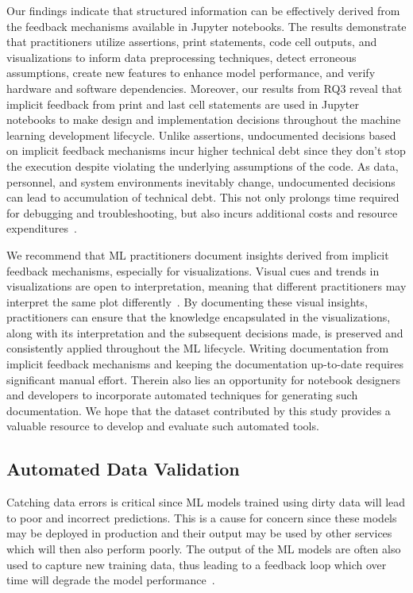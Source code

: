 \documentclass[smallextended]{svjour3}       %
\begin{document}
Our findings indicate that structured information can be effectively derived from the feedback mechanisms available in Jupyter notebooks. The results demonstrate that practitioners utilize assertions, print statements, code cell outputs, and visualizations to inform data preprocessing techniques, detect erroneous assumptions, create new features to enhance model performance, and verify hardware and software dependencies. Moreover, our results from RQ3 reveal that implicit feedback from print and last cell statements are used in Jupyter notebooks to make design and implementation decisions throughout the machine learning development lifecycle. Unlike assertions, undocumented decisions based on implicit feedback mechanisms incur higher technical debt since they don't stop the execution despite violating the underlying assumptions of the code. As data, personnel, and system environments inevitably change, undocumented decisions can lead to accumulation of technical debt. This not only prolongs time required for debugging and troubleshooting, but also incurs additional costs and resource expenditures~\citep{sculley2015hidden,amershi2019software,sambasivan2021everyone}.

We recommend that ML practitioners document insights derived from implicit feedback mechanisms, especially for visualizations. Visual cues and trends in visualizations are open to interpretation, meaning that different practitioners may interpret the same plot differently~\citep{heer2010tour}. By documenting these visual insights, practitioners can ensure that the knowledge encapsulated in the visualizations, along with its interpretation and the subsequent decisions made, is preserved and consistently applied throughout the ML lifecycle. Writing documentation from implicit feedback mechanisms and keeping the documentation up-to-date requires significant manual effort. Therein also lies an opportunity for notebook designers and developers to incorporate automated techniques for generating such documentation. We hope that the dataset contributed by this study provides a valuable resource to develop and evaluate such automated tools.

\subsection{Automated Data Validation}

Catching data errors is critical since ML models trained using dirty data will lead to poor and incorrect predictions. This is a cause for concern since these models may be deployed in production and their output may be used by other services which will then also perform poorly. The output of the ML models are often also used to capture new training data, thus leading to a feedback loop which over time will degrade the model performance~\citep{sculley2015hidden,breck2019data}.
\end{document}
